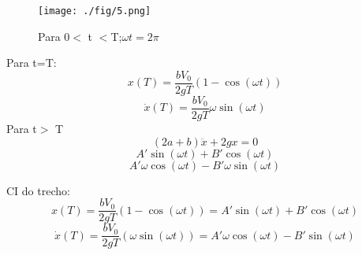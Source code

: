 \documentclass[a4paper, 12pt]{article}
\begin{document}
\begin{figure}[h]
\begin{center}
\texttt{[image: ./fig/5.png]}
\caption{\label{fig:5}Para 0$<$  t $<$T;$\omega t = 2\pi$} 
\end{center}
\end{figure}

Para t=T:
\[x(T)=\frac{bV_{0}}{2gT}(1-\cos(\omega t))\]
\[\dot{x}(T)=\frac{bV_{0}}{2gT}\omega \sin(\omega t)\]
Para t$>$ T
\[(2a+b)\ddot{x}+2gx=0\]
\[A'\sin(\omega t)+B'\cos(\omega t)\]
\[A' \omega\cos(\omega t)-B' \omega\sin(\omega t)\]

CI do trecho:
\[x(T)=\frac{bV_{0}}{2gT}(1-\cos(\omega t))=A'\sin(\omega t)+B'\cos(\omega t)\]
\[\dot{x}(T)=\frac{bV_{0}}{2gT}(\omega \sin(\omega t))=A' \omega\cos(\omega t)-B'\sin(\omega t)\]
\end{document}
